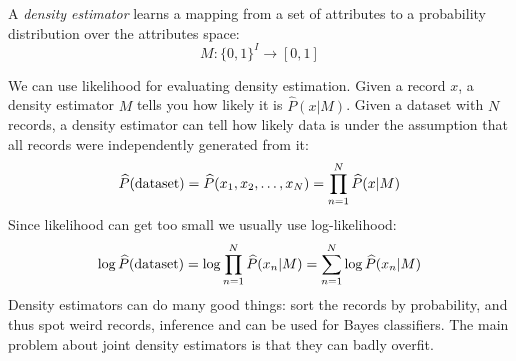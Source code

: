 \documentclass[12pt, a4paper]{report}
\begin{document}
    \begin{definition}
        A \emph{density estimator} learns a mapping from a set of attributes to a probability distribution over the attributes space: 
        \[M:\{0,1\}^I \rightarrow [0,1]\]
    \end{definition}
    We can use likelihood for evaluating density estimation. Given a record $x$, a density estimator $M$ tells you how likely it is $\widehat{P}(x|M)$. Given a dataset with $N$ 
    records, a density estimator can tell how likely data is under the assumption that all records were independently generated from it: 
    \[\widehat{P}(\textnormal{dataset})=\widehat{P}(x_1,x_2,\dots,x_N)=\prod_{n=1}^{N}\widehat{P}(x|M)\]
    Since likelihood can get too small we usually use log-likelihood:
    \[\log{\widehat{P}(\textnormal{dataset})}=\log{\prod_{n=1}^{N}{\widehat{P}(x_n|M)}}=\sum_{n=1}^{N}{\log{\widehat{P}(x_n|M)}}\]
    Density estimators can do many good things: sort the records by probability, and thus spot weird records, inference and can be used for Bayes classifiers. 
    The main problem about joint density estimators is that they can badly overfit. 
\end{document}
